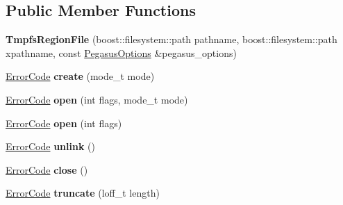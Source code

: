 \subsection*{Public Member Functions}
\begin{DoxyCompactItemize}
\item 
{\bfseries Tmpfs\+Region\+File} (boost\+::filesystem\+::path pathname, boost\+::filesystem\+::path xpathname, const \hyperlink{structalps_1_1PegasusOptions}{Pegasus\+Options} \&pegasus\+\_\+options)\hypertarget{classalps_1_1TmpfsRegionFile_a64efd95e0f04958b38848f00ba625398}{}\label{classalps_1_1TmpfsRegionFile_a64efd95e0f04958b38848f00ba625398}

\item 
\hyperlink{group__ERRORCODES_ga6263a3c9a0b8d36aea21cdd835ac99fe}{Error\+Code} {\bfseries create} (mode\+\_\+t mode)\hypertarget{classalps_1_1TmpfsRegionFile_af056c20aaaba28a3773c86e00978dfef}{}\label{classalps_1_1TmpfsRegionFile_af056c20aaaba28a3773c86e00978dfef}

\item 
\hyperlink{group__ERRORCODES_ga6263a3c9a0b8d36aea21cdd835ac99fe}{Error\+Code} {\bfseries open} (int flags, mode\+\_\+t mode)\hypertarget{classalps_1_1TmpfsRegionFile_a2d41f9debc39a99d4dc8d3dd8829fb14}{}\label{classalps_1_1TmpfsRegionFile_a2d41f9debc39a99d4dc8d3dd8829fb14}

\item 
\hyperlink{group__ERRORCODES_ga6263a3c9a0b8d36aea21cdd835ac99fe}{Error\+Code} {\bfseries open} (int flags)\hypertarget{classalps_1_1TmpfsRegionFile_afe41df2a968e570755ff6053e1d50836}{}\label{classalps_1_1TmpfsRegionFile_afe41df2a968e570755ff6053e1d50836}

\item 
\hyperlink{group__ERRORCODES_ga6263a3c9a0b8d36aea21cdd835ac99fe}{Error\+Code} {\bfseries unlink} ()\hypertarget{classalps_1_1TmpfsRegionFile_a47210b5f2e7af168672fa36e845bf4fa}{}\label{classalps_1_1TmpfsRegionFile_a47210b5f2e7af168672fa36e845bf4fa}

\item 
\hyperlink{group__ERRORCODES_ga6263a3c9a0b8d36aea21cdd835ac99fe}{Error\+Code} {\bfseries close} ()\hypertarget{classalps_1_1TmpfsRegionFile_a3823425d2b9d276066a66ef09eadea7b}{}\label{classalps_1_1TmpfsRegionFile_a3823425d2b9d276066a66ef09eadea7b}

\item 
\hyperlink{group__ERRORCODES_ga6263a3c9a0b8d36aea21cdd835ac99fe}{Error\+Code} {\bfseries truncate} (loff\+\_\+t length)\hypertarget{classalps_1_1TmpfsRegionFile_af5c68479c8c306464ef9a6ac936d7e16}{}\label{classalps_1_1TmpfsRegionFile_af5c68479c8c306464ef9a6ac936d7e16}


\end{DoxyCompactItemize}
